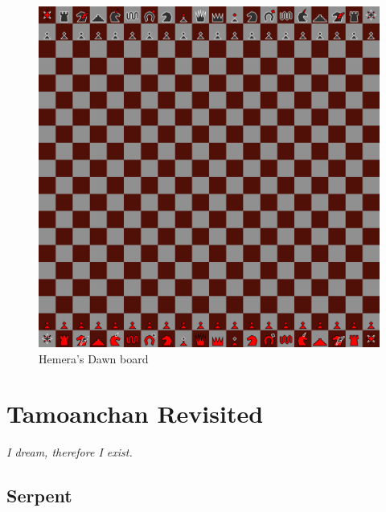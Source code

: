 \documentclass[a5paper,12pt,draft]{book} %
\begin{document}
\noindent
\begin{figure}[h]
\includegraphics[width=1.0\textwidth, keepaspectratio=true]{../gfx/boards/14_hemera_s_dawn.png}
\caption{Hemera's Dawn board}
\label{fig:hemera_s_dawn}
\end{figure}

\clearpage

\chapter*{Tamoanchan Revisited}

\begin{flushright}
\parbox{0.6\textwidth}{
\emph{I dream, therefore I exist. \\
 } }
\end{flushright}

\section*{Serpent}
\end{document}
